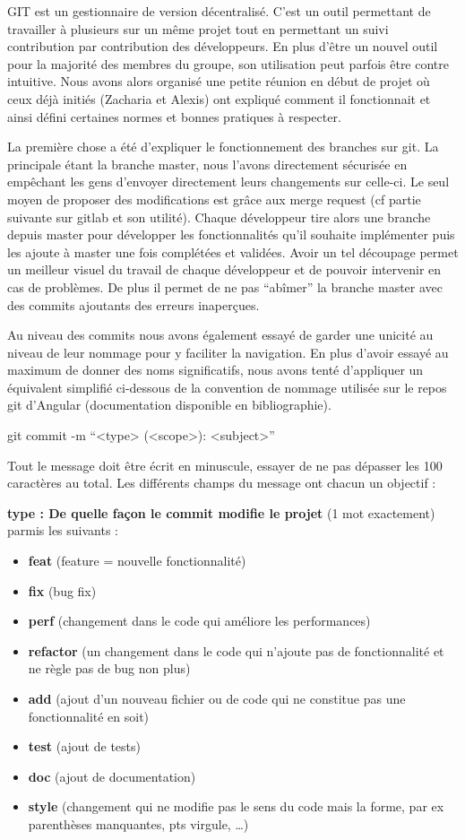 \hspace{3em}
GIT est un gestionnaire de version décentralisé. C’est un outil permettant de travailler à plusieurs sur un même projet tout en permettant un suivi contribution par contribution des développeurs. En plus d’être un nouvel outil pour la majorité des membres du groupe, son utilisation peut parfois être contre intuitive. Nous avons alors organisé une petite réunion en début de projet où ceux déjà initiés (Zacharia et Alexis) ont expliqué comment il fonctionnait et ainsi défini certaines normes et bonnes pratiques à respecter.

	La première chose a été d’expliquer le fonctionnement des branches sur git. La principale étant la branche master, nous l’avons directement sécurisée en empêchant les gens d’envoyer directement leurs changements sur celle-ci. Le seul moyen de proposer des modifications est grâce aux merge request (cf partie suivante sur gitlab et son utilité). Chaque développeur tire alors une branche depuis master pour développer les fonctionnalités qu’il souhaite implémenter puis les ajoute à master une fois complétées et validées. Avoir un tel découpage permet un meilleur visuel du travail de chaque développeur et de pouvoir intervenir en cas de problèmes. De plus il permet de ne pas “abîmer” la branche master avec des commits ajoutants des erreurs inaperçues.

	Au niveau des commits nous avons également essayé de garder une unicité au niveau de leur nommage pour y faciliter la navigation. En plus d’avoir essayé au maximum de donner des noms significatifs, nous avons tenté d’appliquer un équivalent simplifié ci-dessous de la convention de nommage utilisée sur le repos git d’Angular (documentation disponible en bibliographie).

git commit -m “<type> (<scope>): <subject>”

Tout le message doit être écrit en minuscule, essayer de ne pas dépasser les 100 caractères au total. Les différents champs du message ont chacun un objectif :

\textbf{type : De quelle façon le commit modifie le projet} (1 mot exactement) parmis les suivants :
\begin{itemize}
  \item \textbf{feat} (feature = nouvelle fonctionnalité)
  \item \textbf{fix} (bug fix)
  \item \textbf{perf} (changement dans le code qui améliore les performances)
  \item \textbf{refactor} (un changement dans le code qui n’ajoute pas de fonctionnalité et ne règle pas de bug non plus)
  \item \textbf{add} (ajout d’un nouveau fichier ou de code qui ne constitue pas une fonctionnalité en soit)
  \item \textbf{test} (ajout de tests)
  \item \textbf{doc} (ajout de documentation)
  \item \textbf{style} (changement qui ne modifie pas le sens du code mais la forme, par ex parenthèses manquantes, pts virgule, …)
\end{itemize}

